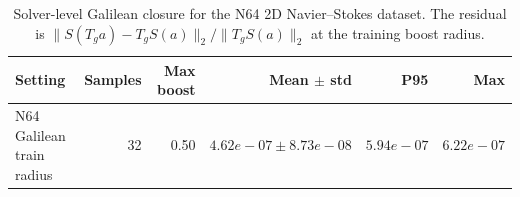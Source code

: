 \begin{table}[t]
\centering
\small
\caption{Solver-level Galilean closure for the N64 2D Navier--Stokes dataset. The residual is $\|S(T_g a)-T_gS(a)\|_2/\|T_gS(a)\|_2$ at the training boost radius.}
\label{tab:n64-solver-closure}
\begin{tabular}{lrrrrr}
\toprule
Setting & Samples & Max boost & Mean $\pm$ std & P95 & Max \\
\midrule
N64 Galilean train radius & 32 & 0.50 & \(4.62e-07\pm8.73e-08\) & \(5.94e-07\) & \(6.22e-07\) \\
\bottomrule
\end{tabular}
\end{table}
